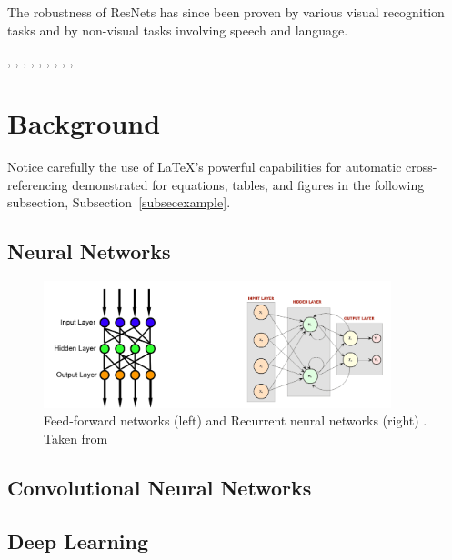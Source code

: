 \documentclass[12pt]{article}
\numberwithin{equation}{section}
\numberwithin{table}{section}
\numberwithin{figure}{section}
\begin{document}
The robustness of ResNets has since been proven by various visual recognition tasks and by non-visual tasks involving speech and language\cite{Michael:Online}.





\cite{He2016}, \cite{Veit2016}, \cite{Wu2017}, \cite{Xie2016} , \cite{Zagoruyko2016}, \cite{Long2016}
, \cite{Huang2016}, \cite{Philipp2017} , \cite{Targ2016} , \cite{Wang2017}


\section{Background} \label{secimport}

Notice carefully the use of \LaTeX's powerful capabilities for automatic
cross-referencing demonstrated
for equations, tables, and figures
in the following subsection,
Subsection~\ref{subsecexample}.

\subsection{Neural Networks}

\begin{figure}[H] \centering
	\includegraphics[width=0.9\textwidth]{image7.png}
	\caption{Feed-forward networks (left) and Recurrent neural networks (right) .  Taken from  }
	\label{figre7}
\end{figure}


\subsection{Convolutional Neural Networks}


\subsection{Deep Learning}
\end{document}
